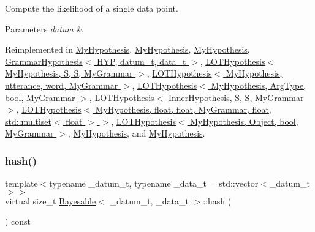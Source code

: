 Compute the likelihood of a single data point. 


\begin{DoxyParams}{Parameters}
{\em datum} & \\
\hline
\end{DoxyParams}


Reimplemented in \hyperlink{class_my_hypothesis_af2470b1e04711c06ee551deae15af4c1}{My\+Hypothesis}, \hyperlink{class_my_hypothesis_a480fc9e50d0faa0f5226f56187fd2eec}{My\+Hypothesis}, \hyperlink{class_my_hypothesis_af23a45a03a28ea4f42438e70d47acacb}{My\+Hypothesis}, \hyperlink{class_grammar_hypothesis_ad8e5300800646a0c0af9a0f7d0b86422}{Grammar\+Hypothesis$<$ H\+Y\+P, datum\+\_\+t, data\+\_\+t $>$}, \hyperlink{class_l_o_t_hypothesis_a0ff11e5e328fcfa819a8dd9b5d57bd65}{L\+O\+T\+Hypothesis$<$ My\+Hypothesis, S, S, My\+Grammar $>$}, \hyperlink{class_l_o_t_hypothesis_a0ff11e5e328fcfa819a8dd9b5d57bd65}{L\+O\+T\+Hypothesis$<$ My\+Hypothesis, utterance, word, My\+Grammar $>$}, \hyperlink{class_l_o_t_hypothesis_a0ff11e5e328fcfa819a8dd9b5d57bd65}{L\+O\+T\+Hypothesis$<$ My\+Hypothesis, Arg\+Type, bool, My\+Grammar $>$}, \hyperlink{class_l_o_t_hypothesis_a0ff11e5e328fcfa819a8dd9b5d57bd65}{L\+O\+T\+Hypothesis$<$ Inner\+Hypothesis, S, S, My\+Grammar $>$}, \hyperlink{class_l_o_t_hypothesis_a0ff11e5e328fcfa819a8dd9b5d57bd65}{L\+O\+T\+Hypothesis$<$ My\+Hypothesis, float, float, My\+Grammar, float, std\+::multiset$<$ float $>$ $>$}, \hyperlink{class_l_o_t_hypothesis_a0ff11e5e328fcfa819a8dd9b5d57bd65}{L\+O\+T\+Hypothesis$<$ My\+Hypothesis, Object, bool, My\+Grammar $>$}, \hyperlink{class_my_hypothesis_af23a45a03a28ea4f42438e70d47acacb}{My\+Hypothesis}, and \hyperlink{class_my_hypothesis_af23a45a03a28ea4f42438e70d47acacb}{My\+Hypothesis}.

\mbox{\label{class_bayesable_a26f6d55e7526ebd897cbb27c757b611b}} 
\subsubsection{\texorpdfstring{hash()}{hash()}}
{\footnotesize\ttfamily template$<$typename \+\_\+datum\+\_\+t, typename \+\_\+data\+\_\+t = std\+::vector$<$\+\_\+datum\+\_\+t$>$$>$ \\
virtual size\+\_\+t \hyperlink{class_bayesable}{Bayesable}$<$ \+\_\+datum\+\_\+t, \+\_\+data\+\_\+t $>$\+::hash (\begin{DoxyParamCaption}{ }\end{DoxyParamCaption}) const\hspace{0.3cm}{\ttfamily [pure virtual]}}



